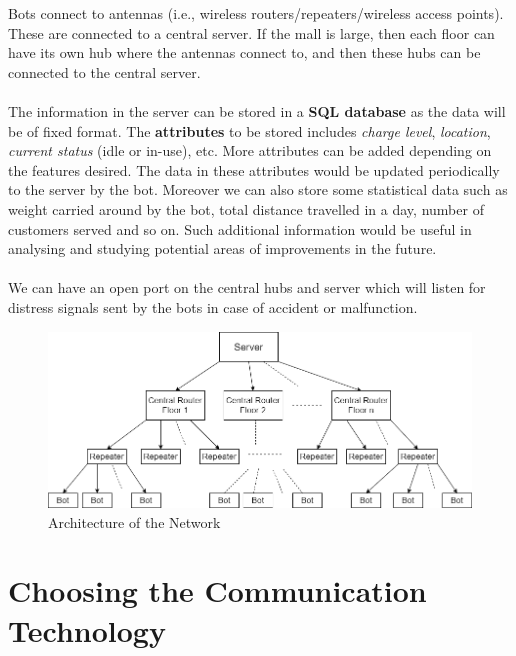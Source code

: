 \documentclass{article}
\newcommand{\eat}[1]{} %
\begin{document}
Bots connect to antennas (i.e., wireless routers/repeaters/wireless access points). These are connected to a central server. If the mall is large, then each floor can have its own hub where the antennas connect to, and then these hubs can be connected to the central server.
\\ \\
The information in the server can be stored in a \textbf{SQL database} as the data will be of fixed format. The \textbf{attributes} to be stored includes \textit{charge level}, \textit{location}, \textit{current status} (idle or in-use), etc. More attributes can be added depending on the features desired. The data in these attributes would be updated periodically to the server by the bot. Moreover we can also store some statistical data such as weight carried around by the bot, total distance travelled in a day, number of customers served and so on. Such additional information would be useful in analysing and studying potential areas of improvements in the future. \eat{These data then can be analysed for detecting potential areas of improvement in future.}
\\ \\
We can have an open port on the central hubs and server which will listen for distress signals sent by the bots in case of accident or malfunction.

\begin{figure}[h]
    \centering
    \includegraphics[scale=0.5]{Images/Communication.png}
    \caption{Architecture of the Network}
\end{figure}

\section{Choosing the Communication Technology}
\end{document}

